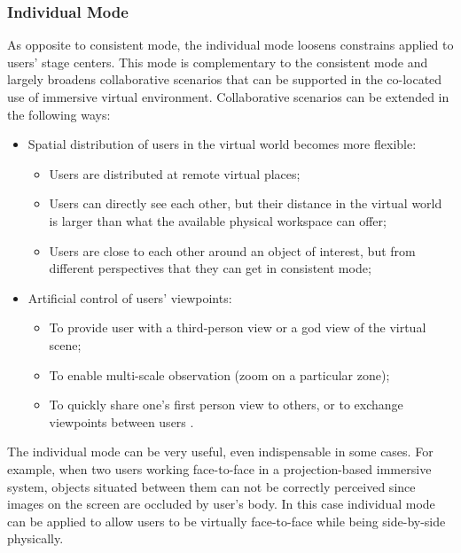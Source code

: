 \subsubsection{Individual Mode}
As opposite to consistent mode, the individual mode loosens constrains applied to users' stage centers. This mode is complementary to the consistent mode and largely broadens collaborative scenarios that can be supported in the co-located use of immersive virtual environment. Collaborative scenarios can be extended in the following ways:

\begin{itemize}
\item Spatial distribution of users in the virtual world becomes more flexible:
\begin{itemize}
  \item Users are distributed at remote virtual places;
  \item Users can directly see each other, but their distance in the virtual world is larger than what the available physical workspace can offer;
  \item Users are close to each other around an object of interest, but from different perspectives that they can get in consistent mode;
\end{itemize}
\item Artificial control of users' viewpoints:
\begin{itemize}
  \item To provide user with a third-person view or a god view of the virtual scene;
  \item To enable multi-scale observation (zoom on a particular zone);
  \item To quickly share one's first person view to others, or to exchange viewpoints between users \citep{Lopez2014Exchange}.
\end{itemize}
\end{itemize}

The individual mode can be very useful, even indispensable in some cases. For example, when two users working face-to-face in a projection-based immersive system, objects situated between them can not be correctly perceived since images on the screen are occluded by user's body. In this case individual mode can be applied to allow users to be virtually face-to-face while being side-by-side physically.

